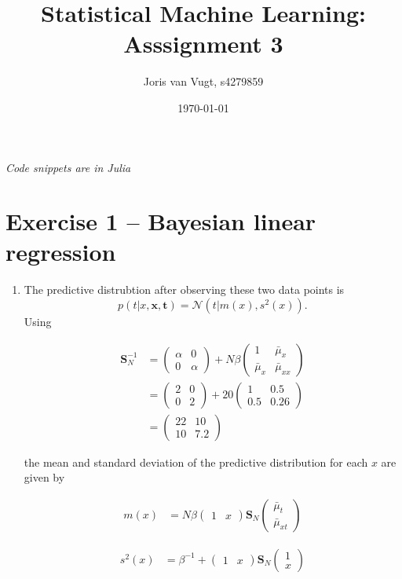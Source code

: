 \documentclass{article}
\author{Joris van Vugt, s4279859}
\date{\today}
\title{Statistical Machine Learning: Asssignment 3}
\begin{document}
\maketitle
\emph{Code snippets are in Julia}
\section*{Exercise 1 -- Bayesian linear regression}
\begin{enumerate}
\item The predictive distrubtion after observing these two data points is
$$ p(t| x, \bm{x}, \bm{t}) = \mathcal{N}(t|m(x), s^2(x)). $$
Using

\begin{align*}
\bm{S}_N^{-1} &= \begin{pmatrix}\alpha & 0 \\ 0 & \alpha\end{pmatrix} + N\beta\begin{pmatrix}1 & \bar{\mu}_x \\ \bar{\mu}_x & \bar{\mu}_{xx}\end{pmatrix} \\
&= \begin{pmatrix}2 & 0 \\ 0 & 2\end{pmatrix} + 20\begin{pmatrix}1 & 0.5 \\ 0.5 & 0.26\end{pmatrix} \\
&= \begin{pmatrix}22 & 10 \\ 10 & 7.2\end{pmatrix}
\end{align*}

the mean and standard deviation of the predictive distribution for each $x$ are given by

\begin{align*}
m(x) &= N\beta\begin{pmatrix}1 & x\end{pmatrix} \bm{S}_N\begin{pmatrix} \bar{\mu}_t \\ \bar{\mu}_{xt} \end{pmatrix}
\end{align*}

\begin{align*}
s^2(x) &= \beta^{-1} + \begin{pmatrix}1 & x\end{pmatrix}\bm{S}_N\begin{pmatrix} 1 \\ x \end{pmatrix}
\end{align*}


\end{enumerate}
\end{document}
